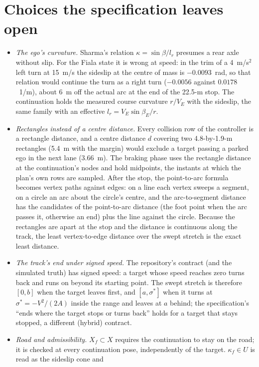 \documentclass[11pt]{article}
\begin{document}
\section{Choices the specification leaves open}
\label{sec:choices}
\begin{itemize}
\item \emph{The ego's curvature.} Sharma's relation $\kappa=\sin\beta/l_r$
presumes a rear axle without slip. For the Fiala state it is wrong at speed:
in the trim of a 4~m/s$^2$ left turn at 15~m/s the sideslip at the centre of
mass is $-0.0093$~rad, so that relation would continue the turn as a right
turn ($-0.0056$ against $0.0178$~1/m), about 6~m off the actual arc at the
end of the 22.5-m stop. The continuation holds the measured course curvature
$r/V_E$ with the sideslip, the same family with an effective
$l_r=V_E\sin\beta_E/r$.
\item \emph{Rectangles instead of a centre distance.} Every collision row of
the controller is a rectangle distance, and a centre distance $d$ covering two
4.8-by-1.9-m rectangles (5.4~m with the margin) would exclude a target
passing a parked ego in the next lane (3.66~m). The braking phase uses the
rectangle distance at the continuation's nodes and hold midpoints, the
instants at which the plan's own rows are sampled. After the stop, the
point-to-arc formula becomes vertex paths against edges: on a line each
vertex sweeps a segment, on a circle an arc about the circle's centre, and
the arc-to-segment distance has the candidates of the point-to-arc distance
(the foot point when the arc passes it, otherwise an end) plus the line
against the circle. Because the rectangles are apart at the stop and the
distance is continuous along the track, the least vertex-to-edge distance
over the swept stretch is the exact least distance.
\item \emph{The track's end under signed speed.} The repository's contract
(and the simulated truth) has signed speed: a target whose speed reaches
zero turns back and runs on beyond its starting point. The swept stretch is
therefore $[0,b]$ when the target leaves first, and $[a,\sigma^*]$ when it
turns at $\sigma^*=-V^2/(2A)$ inside the range and leaves at $a$ behind; the
specification's ``ends where the target stops or turns back'' holds for a
target that stays stopped, a different (hybrid) contract.
\item \emph{Road and admissibility.} $X_f\subset X$ requires the
continuation to stay on the road; it is checked at every continuation pose,
independently of the target. $\kappa_f\in U$ is read as the sideslip cone and

\end{itemize}
\end{document}
